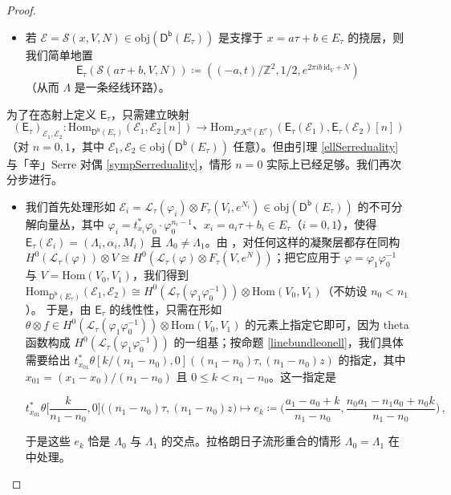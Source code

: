 \begin{proof}
\begin{itemize}[leftmargin=0.5cm]
	\item 若 $\mathcal{E}=\mathcal{S}(x,V,N)\in\text{obj}(\mathsf{D^b}(E_{\tau}))$ 是支撑于 $x=a\tau+b\in E_\tau$ 的挠层，则我们简单地置
	\[
	\mathsf{E}_\tau(\mathcal{S}(a\tau+b,V,N))\coloneqq((-a,t)/\mathbb{Z}^2,1/2,e^{2\pi i b\,\text{id}_V+N})
	\]
	（从而 $\Lambda$ 是一条经线环路）。   
\end{itemize}
为了在态射上定义 $\mathsf{E}_\tau$，只需建立映射
\[
(\mathsf{E}_\tau)_{\mathcal{E}_1,\mathcal{E}_2}:\text{Hom}_{\mathsf{D^b}(E_\tau)}(\mathcal{E}_1,\mathcal{E}_2[n])\rightarrow\text{Hom}_{\mathscr{F\!K}^0(E^\tau)}(\mathsf{E}_\tau(\mathcal{E}_1),\mathsf{E}_\tau(\mathcal{E}_2)[n])
\]
（对 $n=0,1$，其中 $\mathcal{E}_1,\mathcal{E}_2\in\text{obj}(\mathsf{D^b}(E_\tau))$ 任意）。但由引理 \ref{ellSerreduality} 与「辛」Serre 对偶 \eqref{sympSerreduality}，情形 $n=0$ 实际上已经足够。我们再次分步进行。
\begin{itemize}[leftmargin=0.5cm]
	\item 我们首先处理形如 $\mathcal{E}_i=\mathcal{L}_\tau(\varphi_i)\otimes F_\tau(V_i,e^{N_i})\in\text{obj}(\mathsf{D^b}(E_\tau))$ 的不可分解向量丛，其中 $\varphi_i=t_{x_i}^*\varphi_0\cdot\varphi_0^{n_i-1}$、$x_i=a_i\tau+b_i\in E_\tau$（$i=0,1$），使得 $\mathsf{E}_\tau(\mathcal{E}_i)=(\Lambda_i,\alpha_i,M_i)$ 且 $\Lambda_0\neq\Lambda_1$。由 \cite[命题 2]{[PZ00]}，对任何这样的凝聚层都存在同构 $H^0(\mathcal{L}_\tau(\varphi))\otimes V\cong H^0(\mathcal{L}_\tau(\varphi)\otimes F_\tau(V,e^{N}))$；把它应用于 $\varphi=\varphi_1\varphi_0^{-1}$ 与 $V=\text{Hom}(V_0,V_1)$，我们得到 $\text{Hom}_{\mathsf{D^b}(E_\tau)}(\mathcal{E}_1,\mathcal{E}_2)\cong H^0(\mathcal{L}_\tau(\varphi_1\varphi_0^{-1}))\otimes\text{Hom}(V_0,V_1)$（不妨设 $n_0<n_1$）。 
	\newline 于是，由 $\mathsf{E}_\tau$ 的线性性，只需在形如 $\theta\otimes f\in H^0(\mathcal{L}_\tau(\varphi_1\varphi_0^{-1}))\otimes\text{Hom}(V_0,V_1)$ 的元素上指定它即可，因为 theta 函数构成 $H^0(\mathcal{L}_\tau(\varphi_1\varphi_0^{-1}))$ 的一组基；按命题 \ref{linebundleonell}，我们具体需要给出 $t_{x_{01}}^*\theta[k/(n_1\!-\!n_0),0]((n_1\!-\!n_0)\tau,(n_1\!-\!n_0)z)$ 的指定，其中 $x_{01}=(x_1\!-\!x_0)/(n_1\!-\!n_0)$ 且 $0\leq k<n_1\!-\!n_0$。这一指定是
	\begin{small}\[
		t_{x_{01}}^*\theta\Big[\frac{k}{n_1\!-\!n_0},0\Big]\big((n_1\!-\!n_0)\tau,(n_1\!-\!n_0)z\big)\mapsto e_k\!\coloneqq\!\Big(\frac{a_1\!-\!a_0\!+\!k}{n_1\!-\!n_0},\frac{n_0a_1\!-\!n_1a_0\!+\!n_0k}{n_1\!-\!n_0}\Big)\,,
		\]\end{small}
	\!\!于是这些 $e_k$ 恰是 $\Lambda_0$ 与 $\Lambda_1$ 的交点。拉格朗日子流形重合的情形 $\Lambda_0=\Lambda_1$ 在 \cite{[Kre00]} 中处理。
	

\end{itemize}
\end{proof}
